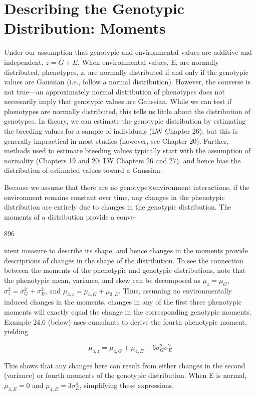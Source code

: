 \documentclass{article}
\begin{document}
\section{Describing the Genotypic Distribution: Moments}
Under our assumption that genotypic and environmental values are additive and independent,  $ z = G + E $. When environmental values, E, are normally distributed, phenotypes, z, are normally distributed if and only if the genotypic values are Gaussian (i.e., follow a normal distribution). However, the converse is not true—an approximately normal distribution of phenotypes does not necessarily imply that genotypic values are Gaussian. While we can test if phenotypes are normally distributed, this tells us little about the distribution of genotypes. In theory, we can estimate the genotypic distribution by estimating the breeding values for a sample of individuals (LW Chapter 26), but this is generally impractical in most studies (however, see Chapter 20). Further, methods used to estimate breeding values typically start with the assumption of normality (Chapters 19 and 20; LW Chapters 26 and 27), and hence bias the distribution of estimated values toward a Gaussian.

Because we assume that there are no genotype×environment interactions, if the environment remains constant over time, any changes in the phenotypic distribution are entirely due to changes in the genotypic distribution. The moments of a distribution provide a conve-

896

nient measure to describe its shape, and hence changes in the moments provide descriptions of changes in the shape of the distribution. To see the connection between the moments of the phenotypic and genotypic distributions, note that the phenotypic mean, variance, and skew can be decomposed as  $ \mu_z = \mu_G $,  $ \sigma_z^2 = \sigma_G^2 + \sigma_E^2 $, and  $ \mu_{3,z} = \mu_{3,G} + \mu_{3,E} $. Thus, assuming no environmentally induced changes in the moments, changes in any of the first three phenotypic moments will exactly equal the change in the corresponding genotypic moments. Example 24.6 (below) uses cumulants to derive the fourth phenotypic moment, yielding

\begin{equation}
\mu_{4,z}=\mu_{4,G}+\mu_{4,E}+6\sigma_{G}^{2}\sigma_{E}^{2}
\tag{24.15}
\label{eq:24_15}
\end{equation}

This shows that any changes here can result from either changes in the second (variance) or fourth moments of the genotypic distribution. When E is normal,  $ \mu_{3,E} = 0 $ and  $ \mu_{4,E} = 3\sigma_{E}^{4} $, simplifying these expressions.
\end{document}
